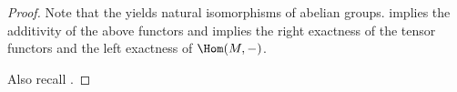 \begin{proof}
    Note that the  yields natural isomorphisms of abelian groups.  implies the additivity of the above functors and implies the right exactness of the tensor functors and the left exactness of $\Hom(M,-)$. 

    Also recall .
\end{proof}
